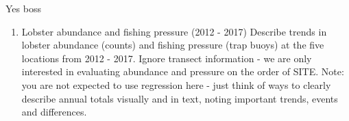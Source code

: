\documentclass[]{article}
\newenvironment{Shaded}{\begin{snugshade}}{\end{snugshade}}
\newcommand{\KeywordTok}[1]{\textcolor[rgb]{0.13,0.29,0.53}{\textbf{{#1}}}}
\newcommand{\DataTypeTok}[1]{\textcolor[rgb]{0.13,0.29,0.53}{{#1}}}
\newcommand{\DecValTok}[1]{\textcolor[rgb]{0.00,0.00,0.81}{{#1}}}
\newcommand{\StringTok}[1]{\textcolor[rgb]{0.31,0.60,0.02}{{#1}}}
\newcommand{\CommentTok}[1]{\textcolor[rgb]{0.56,0.35,0.01}{\textit{{#1}}}}
\newcommand{\NormalTok}[1]{{#1}}
\providecommand{\tightlist}{%
  \setlength{\itemsep}{0pt}\setlength{\parskip}{0pt}}
\begin{document}
Yes boss

\begin{Shaded}
\end{Shaded}

\begin{enumerate}
\def\labelenumi{\arabic{enumi}.}
\tightlist
\item
  Lobster abundance and fishing pressure (2012 - 2017) Describe trends
  in lobster abundance (counts) and fishing pressure (trap buoys) at the
  five locations from 2012 - 2017. Ignore transect information - we are
  only interested in evaluating abundance and pressure on the order of
  SITE. Note: you are not expected to use regression here - just think
  of ways to clearly describe annual totals visually and in text, noting
  important trends, events and differences.
\end{enumerate}
\end{document}
